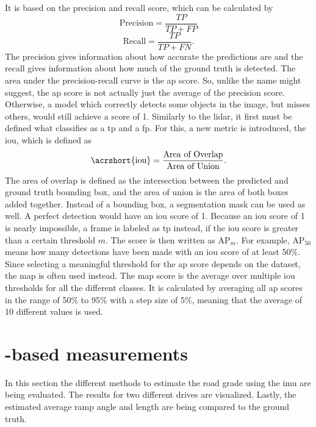 It is based on the precision and recall score, which can be calculated by
\begin{equation}
    \text{Precision} = \frac{TP}{TP+FP}
\end{equation}
\begin{equation}
    \text{Recall} = \frac{TP}{TP+FN}.
\end{equation}
The precision gives information about how accurate the predictions are and the recall gives information about how much of the ground truth is detected.
The area under the precision-recall curve is the \gls{ap} score.
So, unlike the name might suggest, the \gls{ap} score is not actually just the average of the precision score.
Otherwise, a model which correctly detects some objects in the image, but misses others, would still achieve a score of 1.
Similarly to the \gls{lidar}, it first must be defined what classifies as a \gls{tp} and a \gls{fp}.
For this, a new metric is introduced, the \gls{iou}, which is defined as
\begin{equation}
    \text{\acrshort{iou}} = \frac{\text{Area of Overlap}}{\text{Area of Union}}.
\end{equation}
The area of overlap is defined as the intersection between the predicted and ground truth bounding box, and the area of union is the area of both boxes added together.
Instead of a bounding box, a segmentation mask can be used as well.
A perfect detection would have an \gls{iou} score of 1.
Because an \gls{iou} score of 1 is nearly impossible, a frame is labeled as \gls{tp} instead, if the \gls{iou} score is greater than a certain threshold $m$.
The score is then written as $\text{AP}_{m}$.
For example, $\text{AP}_{50}$ means how many detections have been made with an \gls{iou} score of at least 50\%.
Since selecting a meaningful threshold for the \gls{ap} score depends on the dataset, the \gls{map} is often used instead.
The \gls{map} score is the average over multiple \gls{iou} thresholds for all the different classes.
It is calculated by averaging all \gls{ap} scores in the range of 50\% to 95\% with a step size of 5\%, meaning that the average of 10 different values is used.



\section{-based measurements}
\label{sec:eval_imu}
In this section the different methods to estimate the road grade using the \gls{imu} are being evaluated.
The results for two different drives are visualized.
Lastly, the estimated average ramp angle and length are being compared to the ground truth.

